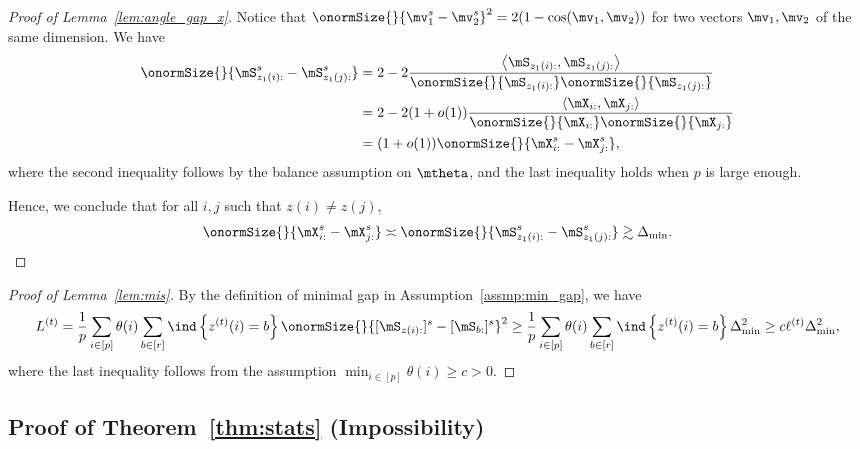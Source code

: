 \documentclass[lettersize,onecolumn,journal]{IEEEtran}
\theoremstyle{definition}
\theoremstyle{definition}
\newcommand{\offf}[1]{\left\{#1\right\}}
\newcommand{\ang}[1]{\left\langle#1\right\rangle}
\begin{document}
{\begin{proof}[Proof of Lemma~\ref{lem:angle_gap_x}]
{Notice that $\onormSize{}{\mv_1^s - \mv_2^s}^2 =  2(1 - \cos(\mv_1, \mv_2))$ for two vectors $\mv_1, \mv_2$ of the same dimension. We have 
\begin{align}
    \onormSize{}{\mS_{z_1(i):}^s - \mS_{z_1(j):}^s}  &= 2 - 2 \frac{ \ang{  \mS_{z_1(i):}, \mS_{z_1(j):} }}{ \onormSize{}{\mS_{z_1(i):}} \onormSize{}{\mS_{z_1(j):}} } \\
    & = 2 - 2 (1+o(1))\frac{ \ang{  \mX_{i:}, \mX_{j:} }}{ \onormSize{}{ \mX_{i:}} \onormSize{}{ \mX_{j:}} } \\
    & = (1 + o(1)) \onormSize{}{\mX_{i:}^s - \mX_{j:}^s},
\end{align}
where the second inequality follows by the balance assumption on $\mtheta$, and the last inequality holds when $p$ is large enough. 

Hence, we conclude that for all $i,j$ such that $z(i) \neq z(j)$,
\begin{equation}
    \onormSize{}{\mX_{i:}^s - \mX_{j:}^s} \asymp \onormSize{}{\mS_{z_1(i):}^s - \mS_{z_1(j):}^s} \gtrsim  \Delta_{\min}.
\end{equation}

}

\end{proof}

\begin{proof}[Proof of Lemma~\ref{lem:mis}]
By the definition of minimal gap in Assumption~\ref{assmp:min_gap}, we have 
\begin{equation}
         L^{(t)} = \frac{1}{p}  \sum_{i \in [p]} \theta(i) \sum_{b \in [r]}  \ind \offf{ z^{(t)}(i) = b } \onormSize{}{ [ \mS_{ z(i):}  ]^s - [ \mS_{b:}  ]^s  }^2 \geq \frac{1}{p}  \sum_{i \in [p]} \theta(i) \sum_{b \in [r]}  \ind \offf{ z^{(t)}(i) = b } \Delta_{\min}^2 \geq c \ell^{(t)} \Delta_{\min}^2,
    \end{equation}
    where the last inequality follows from the assumption $\min_{i \in [p]} \theta(i) \geq c>0$.
\end{proof}


}


\subsection{Proof of Theorem~\ref{thm:stats} (Impossibility)}\label{sec:statprove1}
\end{document}

